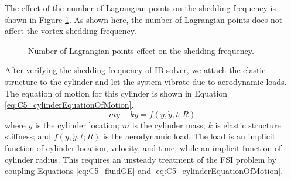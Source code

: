 %
The effect of the number of Lagrangian points on the shedding frequency is shown in Figure \ref{fig:C5_numberOfLagrangianOnSheddingFreq}. As shown here, the number of Lagrangian points does not affect the vortex shedding frequency.
%
\begin{figure}[H]
    \centering
    \quad
    \caption{Number of Lagrangian points effect on the shedding frequency.}
    \label{fig:C5_numberOfLagrangianOnSheddingFreq}
\end{figure}
%
After verifying the shedding frequency of IB solver, we attach the elastic structure to the cylinder and let the system vibrate due to aerodynamic loads. The equation of motion for this cylinder is shown in Equation \eqref{eq:C5_cylinderEquationOfMotion}.
%
\begin{equation}\label{eq:C5_cylinderEquationOfMotion}
	m \ddot{y} + k y = f(y, \dot{y}, t; R)
\end{equation}
%
where $y$ is the cylinder location; $m$ is the cylinder mass; $k$ is elastic structure stiffness; and $f(y, \dot{y}, t; R)$ is the aerodynamic load. The load is an implicit function of cylinder location, velocity, and time, while an implicit function of cylinder radius. This requires an unsteady treatment of the FSI problem by coupling Equations \eqref{eq:C5_fluidGE} and \eqref{eq:C5_cylinderEquationOfMotion}.

